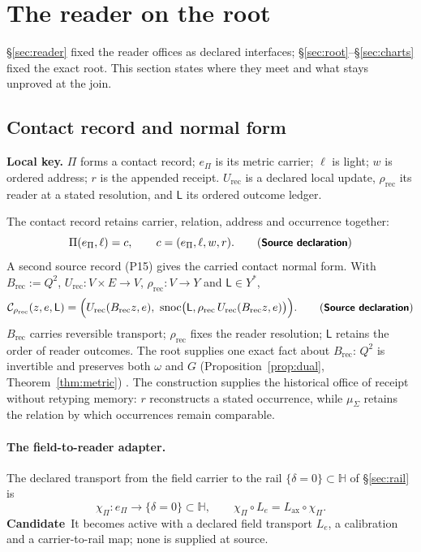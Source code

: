 \documentclass[11pt,a4paper]{article}
\newcommand{\Lax}{L_{\mathrm{ax}}}\newcommand{\Lpr}{L_{\mathrm{pr}}}
\newcommand{\st}[1]{\textsf{\small\textbf{#1}}}
\newcommand{\Ssrc}{\st{Source declaration}}\newcommand{\Sint}{\st{Interface}}
\newcommand{\Scand}{\st{Candidate}}
\newcommand{\lkey}[1]{\par\noindent\textbf{Local key.} #1\par\smallskip}
\theoremstyle{plain}
\theoremstyle{definition}
\theoremstyle{remark}
\begin{document}
\section{The reader on the root}\label{sec:join}
\S\ref{sec:reader} fixed the reader offices as declared interfaces; \S\ref{sec:root}--\S\ref{sec:charts} fixed the exact root. This section states where they meet and what stays unproved at the join.

\subsection{Contact record and normal form}
\lkey{$\Pi$ forms a contact record; $e_\Pi$ is its metric carrier; $\ell$ is light; $w$ is ordered address; $r$ is the appended receipt. $U_{\mathrm{rec}}$ is a declared local update, $\rho_{\mathrm{rec}}$ its reader at a stated resolution, and $\mathsf L$ its ordered outcome ledger.}
The contact record retains carrier, relation, address and occurrence together:
\[
\Pi(e_\Pi,\ell)=c,\qquad c=(e_\Pi,\ell,w,r).\qquad(\Ssrc)
\]
A second source record (P15) gives the carried contact normal form. With $B_{\mathrm{rec}}:=Q^2$, $U_{\mathrm{rec}}:V\times E\to V$, $\rho_{\mathrm{rec}}:V\to Y$ and $\mathsf L\in Y^{*}$,
\[
\mathcal C_{\rho_{\mathrm{rec}}}(z,e,\mathsf L)=\Bigl(U_{\mathrm{rec}}(B_{\mathrm{rec}}z,e),\ \mathrm{snoc}\bigl(\mathsf L,\rho_{\mathrm{rec}}\,U_{\mathrm{rec}}(B_{\mathrm{rec}}z,e)\bigr)\Bigr).\qquad(\Ssrc)
\]
$B_{\mathrm{rec}}$ carries reversible transport; $\rho_{\mathrm{rec}}$ fixes the reader resolution; $\mathsf L$ retains the order of reader outcomes. The root supplies one exact fact about $B_{\mathrm{rec}}$: $Q^2$ is invertible and preserves both $\omega$ and $G$ (Proposition~\ref{prop:dual}, Theorem~\ref{thm:metric}) \Sder. The construction supplies the historical office of receipt without retyping memory: $r$ reconstructs a stated occurrence, while $\mu_\Sigma$ retains the relation by which occurrences remain comparable.

\paragraph{The field-to-reader adapter.} The declared transport from the field carrier to the rail $\{\delta=0\}\subset\mathbb H$ of \S\ref{sec:rail} is
\[
\chi_\Pi:e_\Pi\longrightarrow\{\delta=0\}\subset\mathbb H,\qquad \chi_\Pi\circ L_e=\Lax\circ\chi_\Pi .
\]
\Scand\ It becomes active with a declared field transport $L_e$, a calibration and a carrier-to-rail map; none is supplied at source.
\end{document}
